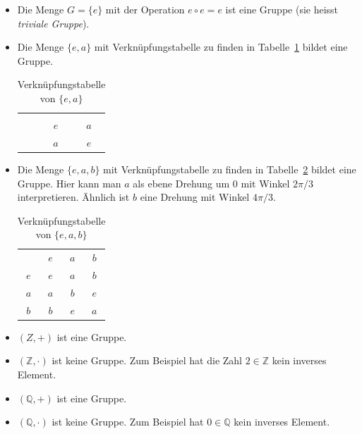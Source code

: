 \documentclass[../main.tex]{subfiles}
\begin{document}
\begin{examples}
  \leavevmode
  \begin{itemize}
    \item Die Menge $G = \{e\}$ mit der Operation
      $e \circ e = e$ ist eine Gruppe (sie heisst \emph{triviale Gruppe}).
    \item Die Menge $\{e, a\}$ mit Verknüpfungstabelle zu finden
      in Tabelle~\ref{tab:ea} bildet eine Gruppe.
      \begin{table}[htb]
        \centering
        \begin{tabular}[h]{ccc}
         & \color{gray}{$e$} & \color{gray}{$a$}\\
        \color{gray}{$e$} & $e$ & $a$ \\
        \color{gray}{$a$} & $a$ & $e$
        \end{tabular}
        \caption{Verknüpfungstabelle von $\{e, a\}$}%
        \label{tab:ea}
      \end{table}

    \item Die Menge $\{e, a, b\}$ mit Verknüpfungstabelle zu finden
      in Tabelle~\ref{tab:eab} bildet eine Gruppe.
      Hier kann man $a$ als ebene Drehung um $0$ mit Winkel $2\pi/3$
      interpretieren. Ähnlich ist $b$ eine Drehung mit
      Winkel $4\pi/3$.
      \begin{table}[htb]
        \centering
        \begin{tabular}[h]{cccc}
        & \color{gray}$e$ & \color{gray}$a$ & \color{gray}$b$\\
        \color{gray}$e$ & $e$ & $a$ & $b$\\
        \color{gray}$a$ & $a$ & $b$ & $e$ \\
        \color{gray}$b$ & $b$ & $e$ & $a$
        \end{tabular}
        \caption{Verknüpfungstabelle von $\{e, a, b\}$}%
        \label{tab:eab}
      \end{table}
      \item $(Z, +)$ ist eine Gruppe.
      \item $(\mathbb Z, \cdot)$ ist keine Gruppe. Zum Beispiel hat die Zahl
      $2 \in \mathbb Z$ kein inverses Element.
      \item $(\mathbb Q, +)$ ist eine Gruppe.
      \item $(\mathbb Q, \cdot)$ ist keine Gruppe. Zum Beispiel hat $0 \in \mathbb Q$
      kein inverses Element.
  \end{itemize}
\end{examples}
\end{document}

